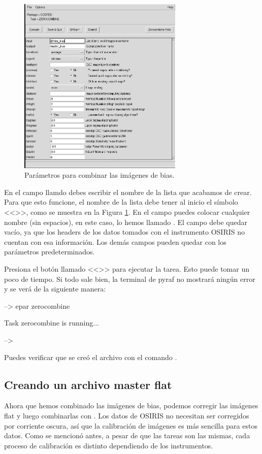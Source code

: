 \begin{figure}[htb]
  \centering
	\includegraphics[width=0.7\textwidth]{figures/pyraf-zerocombine.png}
	\caption{Parámetros para combinar las imágenes de bias.}
	\label{fig:pyraf-zerocombine} 
\end{figure}

En el campo llamdo  debes escribir el nombre de la lista que acabamos de crear. Para que esto funcione, el nombre de la lista debe tener al inicio el símbolo <<>>, como se muestra en la Figura \ref{fig:pyraf-zerocombine}. En el campo  puedes colocar cualquier nombre (sin espacios), en este caso, lo hemos llamado . El campo  debe quedar vacío, ya que los headers de los datos tomados con el instrumento OSIRIS no cuentan con esa información. Los demás campos pueden quedar con los parámetros predeterminados. 

Presiona el botón llamado <<>> para ejecutar la tarea. Esto puede tomar un poco de tiempo. Si todo sale bien, la terminal de pyraf no mostrará ningún error y se verá de la siguiente manera: 

\begin{shell}
--> epar zerocombine

Task zerocombine is running...

--> 
\end{shell}

Puedes verificar que se creó el archivo  con el comando . 

\subsection{Creando un archivo master flat}
Ahora que hemos combinado las imágenes de bias, podemos corregir las imágenes flat y luego combinarlas con . Los datos de OSIRIS no necesitan ser corregidos por corriente oscura, así que la calibración de imágenes es más sencilla para estos datos. Como se mencionó antes, a pesar de que las tareas son las mismas, cada proceso de calibración es distinto dependiendo de los instrumentos.

